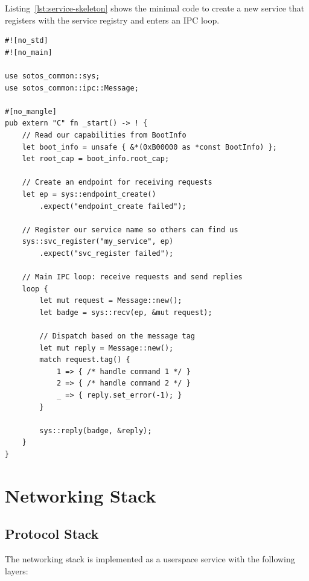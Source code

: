 \documentclass[11pt,a4paper,twoside]{report}
\theoremstyle{definition}
\begin{document}
Listing~\ref{lst:service-skeleton} shows the minimal code to create a
new service that registers with the service registry and enters an IPC
loop.

\begin{lstlisting}[caption={Minimal service skeleton.},label={lst:service-skeleton}]
#![no_std]
#![no_main]

use sotos_common::sys;
use sotos_common::ipc::Message;

#[no_mangle]
pub extern "C" fn _start() -> ! {
    // Read our capabilities from BootInfo
    let boot_info = unsafe { &*(0xB00000 as *const BootInfo) };
    let root_cap = boot_info.root_cap;

    // Create an endpoint for receiving requests
    let ep = sys::endpoint_create()
        .expect("endpoint_create failed");

    // Register our service name so others can find us
    sys::svc_register("my_service", ep)
        .expect("svc_register failed");

    // Main IPC loop: receive requests and send replies
    loop {
        let mut request = Message::new();
        let badge = sys::recv(ep, &mut request);

        // Dispatch based on the message tag
        let mut reply = Message::new();
        match request.tag() {
            1 => { /* handle command 1 */ }
            2 => { /* handle command 2 */ }
            _ => { reply.set_error(-1); }
        }

        sys::reply(badge, &reply);
    }
}
\end{lstlisting}


\chapter{Networking Stack}
\label{ch:net}

\section{Protocol Stack}

The networking stack is implemented as a userspace service with the following
layers:
\end{document}
